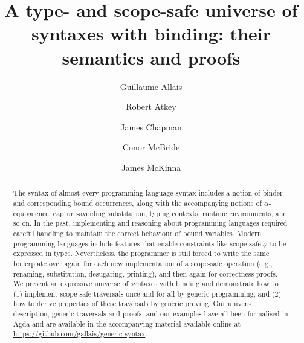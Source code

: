 \documentclass{jfp}
\begin{document}


\totalpg{\pageref{lastpage01}}

\title{A type- and scope-safe universe of syntaxes with binding: their semantics and proofs}

\begin{authgrp}
  \author{Guillaume Allais}\\
  \author{Robert Atkey}
  \author{James Chapman}
  \author{Conor McBride}
  \author{James McKinna}
\end{authgrp}


\begin{abstract}
The syntax of almost every programming language syntax includes a notion of binder
and corresponding bound occurrences, along with the accompanying
notions of $\alpha$-equivalence, capture-avoiding substitution, typing
contexts, runtime environments, and so on. In the past, implementing
and reasoning about programming languages required careful handling to
maintain the correct behaviour of bound variables. Modern programming
languages include features that enable constraints like scope safety
to be expressed in types. Nevertheless, the programmer is still forced
to write the same boilerplate over again for each new implementation
of a scope-safe operation (e.g., renaming, substitution, desugaring,
printing), and then again for correctness proofs.
We present an expressive universe of syntaxes with binding and
demonstrate how to (1) implement scope-safe traversals once and for
all by generic programming; and (2) how to derive properties of these
traversals by generic proving. Our universe description, generic
traversals and proofs, and our examples have all been formalised in
Agda and are available in the accompanying material available online
at \url{https://github.com/gallais/generic-syntax}.
\end{abstract}
\end{document}
